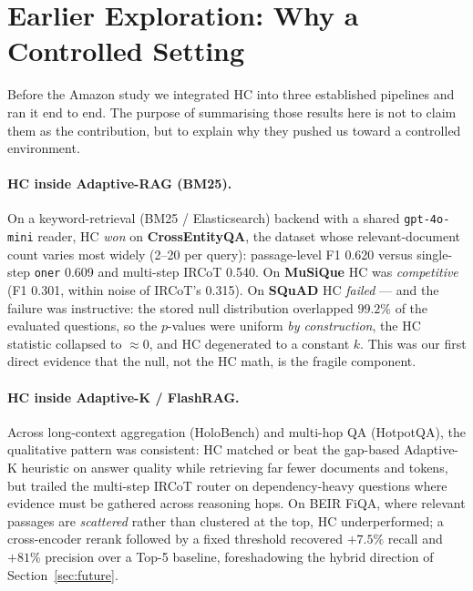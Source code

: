 \documentclass[letterpaper]{article}
\newcommand{\CeqaHCF}{0.620}
\newcommand{\CeqaOnerF}{0.609}
\newcommand{\CeqaIrcotF}{0.540}
\newcommand{\MusHCF}{0.301}
\newcommand{\MusIrcotF}{0.315}
\begin{document}
\section{Earlier Exploration: Why a Controlled Setting}
\label{sec:explore}

Before the Amazon study we integrated HC into three established
pipelines and ran it end to end. The purpose of summarising those
results here is not to claim them as the contribution, but to explain
why they pushed us toward a controlled environment.

\paragraph{HC inside Adaptive-RAG (BM25).}
On a keyword-retrieval (BM25 / Elasticsearch) backend with a shared
\texttt{gpt-4o-mini} reader, HC \emph{won} on \textbf{CrossEntityQA},
the dataset whose relevant-document count varies most widely (2--20 per
query): passage-level F1 \CeqaHCF{} versus single-step \texttt{oner}
\CeqaOnerF{} and multi-step IRCoT \CeqaIrcotF{}. On \textbf{MuSiQue} HC
was \emph{competitive} (F1 \MusHCF, within noise of IRCoT's \MusIrcotF).
On \textbf{SQuAD} HC \emph{failed} --- and the failure was instructive:
the stored null distribution overlapped $99.2\%$ of the evaluated
questions, so the $p$-values were uniform \emph{by construction}, the
HC statistic collapsed to $\approx 0$, and HC degenerated to a constant
$k$. This was our first direct evidence that the null, not the HC math,
is the fragile component.

\paragraph{HC inside Adaptive-K / FlashRAG.}
Across long-context aggregation (HoloBench) and multi-hop QA (HotpotQA),
the qualitative pattern was consistent: HC matched or beat the gap-based
Adaptive-K heuristic on answer quality while retrieving far fewer
documents and tokens, but trailed the multi-step IRCoT router on
dependency-heavy questions where evidence must be gathered across
reasoning hops. On BEIR FiQA, where relevant passages are
\emph{scattered} rather than clustered at the top, HC underperformed;
a cross-encoder rerank followed by a fixed threshold recovered
$+7.5\%$ recall and $+81\%$ precision over a Top-5 baseline, foreshadowing
the hybrid direction of Section~\ref{sec:future}.
\end{document}

